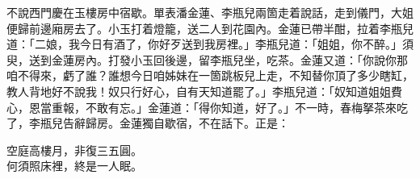 不說西門慶在玉樓房中宿歇。單表潘金蓮、李瓶兒兩箇走着說話，走到儀門，大姐便歸前邊廂房去了。小玉打着燈籠，送二人到花園內。金蓮已帶半酣，拉着李瓶兒道：「二娘，我今日有酒了，你好歹送到我房裡。」李瓶兒道：「姐姐，你不醉。」須臾，送到金蓮房內。打發小玉回後邊，留李瓶兒坐，吃茶。金蓮又道：「你說你那咱不得來，虧了誰？誰想今日咱姊妹在一箇跳板兒上走，不知替你頂了多少瞎缸，教人背地好不說我！奴只行好心，自有天知道罷了。」{}李瓶兒道：「奴知道姐姐費心，恩當重報，不敢有忘。」金蓮道：「得你知道，好了。」不一時，春梅拏茶來吃了，李瓶兒告辭歸房。金蓮獨自歇宿，不在話下。正是：

\begin{myquote} 
空庭高樓月，非復三五圓。\\何須照床裡，終是一人眠。
\end{myquote} 

